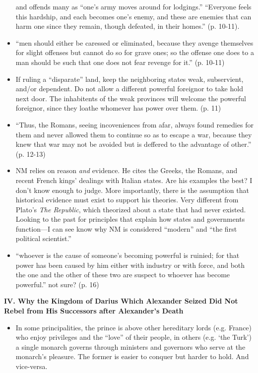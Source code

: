 \documentclass[10pt]{article}
\newcommand{\question}[1]{{\color{BurntOrange}#1}}
\newcommand{\comment}[1]{{\color{Cerulean}#1}}
\newcommand{\keyquote}[1]{{\color{BrickRed}#1}}
\begin{document}
\begin{itemize}
    and offends many as ``one's army moves around for lodgings.''
    ``Everyone feels this hardship, and each becomes one's enemy,
    and these are enemies that can harm one since they remain, 
    though defeated, in their homes.'' (p. 10-11).
\item 
    ``men should either be caressed or eliminated, because they avenge
    themselves for slight offenses but cannot do so for grave ones; so
    the offense one does to a man should be such that one does not fear
    revenge for it.'' (p. 10-11)
\item 
    If ruling a ``disparate'' land, keep the neighboring states weak,
    subservient, and/or dependent. Do not allow a different powerful
    foreignor to take hold next door. The inhabitents of the weak 
    provinces will welcome the powerful foreignor, since they loathe
    whomever has power over them. (p. 11) 
\item
    \keyquote{
    ``Thus, the Romans, seeing incoveniences from afar, always found
    remedies for them and never allowed them to continue so as to 
    escape a war, because they knew that war may not be avoided but 
    is deffered to the advantage of other.''} (p. 12-13)
\item
    \comment{NM relies on reason \textsl{and} evidence. He cites 
    the Greeks, the Romans, and recent French kings' dealings with
    Italian states. Are his examples the best? I don't know enough to 
    judge. More importantly, there is the assumption that historical
    evidence must exist to support his theories. Very different
    from Plato's \textsl{The Republic}, which theorized about
    a state that had never existed. Looking to the past for principles
    that explain how states and governments function---I can see know
    why NM is considered ``modern'' and ``the first political 
    scientist.''}
\item
    ``whoever is the cause of someone's becoming powerful is ruinied;
    for that power has been caused by him either with industry or with
    force, and both the one and the other of these two are suspect to 
    whoever has become powerful.'' \question{not sure?} (p. 16)
\end{itemize}

\textbf{IV. Why the Kingdom of Darius Which Alexander Seized Did Not Rebel
from His Successors after Alexander's Death}
\begin{itemize}
\item
    In some principalities, the prince is above other hereditary lords
    (e.g. France) who enjoy privileges and the ``love'' of their
    people, in others (e.g. `the Turk') a single monarch governs 
    through ministers and governors who serve at the monarch's pleasure.
    The former is easier to conquer but harder to hold. And vice-versa.  
\end{itemize}
\end{document}
